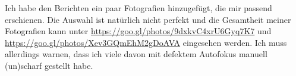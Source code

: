 Ich habe den Berichten ein paar Fotografien hinzugefügt, die mir
passend erschienen. Die Auswahl ist natürlich nicht perfekt und die
Gesamtheit meiner Fotografien kann unter
\url{https://goo.gl/photos/9dxkvC4xrU6Gyq7K7} und
\url{https://goo.gl/photos/Xev3GQmEhM2gDoAVA} eingesehen werden.  Ich
muss allerdings warnen, dass ich viele davon mit defektem Autofokus
manuell (un)scharf gestellt habe.

